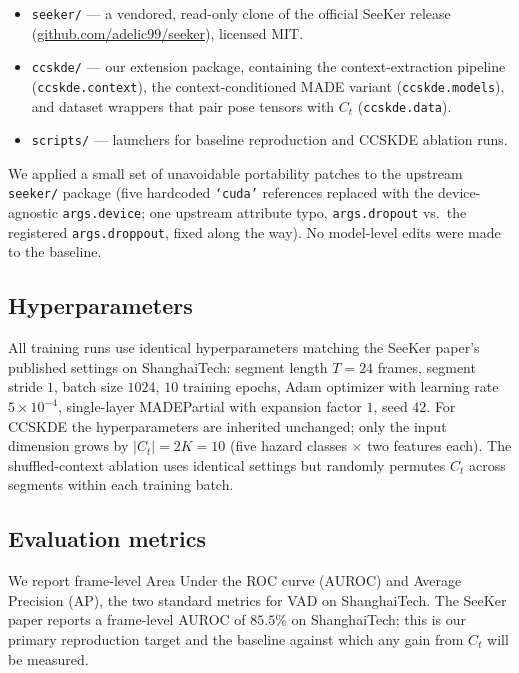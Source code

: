 \documentclass{article}
\begin{document}
\begin{itemize}
    \item \texttt{seeker/} --- a vendored, read-only clone of the official
    SeeKer release~\citep{delic2025seeker} (\url{github.com/adelic99/seeker}),
    licensed MIT.
    \item \texttt{ccskde/} --- our extension package, containing the
    context-extraction pipeline (\texttt{ccskde.context}), the
    context-conditioned MADE variant (\texttt{ccskde.models}), and dataset
    wrappers that pair pose tensors with $C_t$ (\texttt{ccskde.data}).
    \item \texttt{scripts/} --- launchers for baseline reproduction and
    CCSKDE ablation runs.
\end{itemize}

We applied a small set of unavoidable portability patches to the upstream
\texttt{seeker/} package (five hardcoded \texttt{`cuda'} references replaced
with the device-agnostic \texttt{args.device}; one upstream attribute typo,
\texttt{args.dropout} vs.\ the registered \texttt{args.droppout}, fixed
along the way). No model-level edits were made to the baseline.

\subsection{Hyperparameters}
All training runs use identical hyperparameters matching the SeeKer
paper's published settings on ShanghaiTech: segment length $T=24$
frames, segment stride $1$, batch size $1024$, $10$ training epochs,
Adam optimizer with learning rate $5\times10^{-4}$, single-layer
MADEPartial with expansion factor $1$, seed $42$. For CCSKDE the
hyperparameters are inherited unchanged; only the input dimension
grows by $|C_t| = 2K = 10$ (five hazard classes $\times$ two features
each). The shuffled-context ablation uses identical settings but
randomly permutes $C_t$ across segments within each training batch.

\subsection{Evaluation metrics}
We report frame-level Area Under the ROC curve (AUROC) and Average
Precision (AP), the two standard metrics for VAD on ShanghaiTech. The
SeeKer paper reports a frame-level AUROC of $85.5\%$ on ShanghaiTech;
this is our primary reproduction target and the baseline against which any
gain from $C_t$ will be measured.
\end{document}
